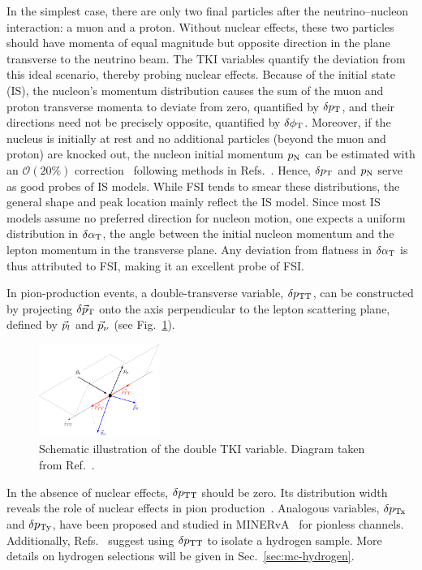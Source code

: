 In the simplest case, there are only two final particles after the neutrino–nucleon interaction: a muon and a proton. 
Without nuclear effects, these two particles should have momenta of equal magnitude but opposite direction in the plane transverse to the neutrino beam.
The TKI variables quantify the deviation from this ideal scenario, thereby probing nuclear effects. 
Because of the initial state (IS), the nucleon’s momentum distribution causes the sum of the muon and proton transverse momenta to deviate from zero, quantified by $\delta p_\textrm{T}$, and their directions need not be precisely opposite, quantified by $\delta\phi_\textrm{T}$.
Moreover, if the nucleus is initially at rest and no additional particles (beyond the muon and proton) are knocked out, the nucleon initial momentum $p_\textrm{N}$ can be estimated with an $\mathcal{O}(20\%)$ correction~\cite{Yang:2023dxk} following methods in Refs.~\cite{Furmanski:2016wqo, Lu:2019nmf}. 
Hence, $\delta p_\textrm{T}$ and $p_\textrm{N}$ serve as good probes of IS models.
While FSI tends to smear these distributions, the general shape and peak location mainly reflect the IS model.
Since most IS models assume no preferred direction for nucleon motion, one expects a uniform distribution in $\delta\alpha_\textrm{T}$, the angle between the initial nucleon momentum and the lepton momentum in the transverse plane.
Any deviation from flatness in $\delta\alpha_\textrm{T}$ is thus attributed to FSI, making it an excellent probe of FSI. 

In pion-production events, a double-transverse variable, $\delta p_\textrm{TT}$, can be constructed by projecting $\delta \vec{p}_\textrm{T}$ onto the axis perpendicular to the lepton scattering plane, defined by $\vec{p}_{l}$ and $\vec{p}_{\nu}$ (see Fig.~\ref{fig:dtki}).
\begin{figure}[!htb] 	
    \centering 		
    \includegraphics[width=0.35\textwidth]{figures/dptt.pdf}
    \caption{\label{fig:dtki} Schematic illustration of the double TKI variable. Diagram taken from Ref.~\cite{T2K:2021naz}.} 
\end{figure}

In the absence of nuclear effects, $\delta p_\textrm{TT}$ should be zero.
Its distribution width reveals the role of nuclear effects in pion production~\cite{MINERvA:2020anu, T2K:2021naz}.
Analogous variables, $\delta p_\textrm{Tx}$ and $\delta p_\textrm{Ty}$, have been proposed and studied in MINERvA~\cite{MINERvA:2019ope} for pionless channels.
Additionally, Refs.~\cite{Lu:2015tcr,Hamacher-Baumann:2020ogq} suggest using $\delta p_\textrm{TT}$ to isolate a hydrogen sample.  
More details on hydrogen selections will be given in Sec.~\ref{sec:mc-hydrogen}.

